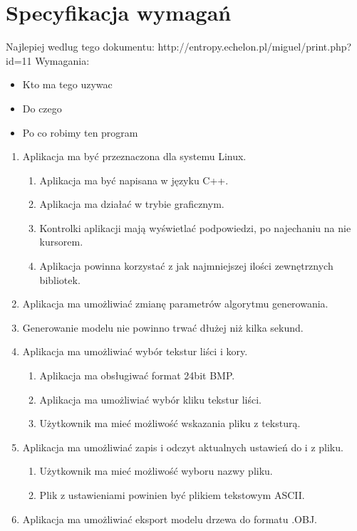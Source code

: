 \chapter{Specyfikacja wymagań}
Najlepiej wedlug tego dokumentu:
http://entropy.echelon.pl/miguel/print.php?id=11
Wymagania:\\
\begin{itemize}
\item Kto ma tego uzywac
\item Do czego
\item Po co robimy ten program
\end{itemize}
\begin{enumerate}

\item Aplikacja ma być przeznaczona dla systemu Linux. 
\begin{enumerate}
\item Aplikacja ma być napisana w języku C++.
\item Aplikacja ma działać w trybie graficznym.
\item Kontrolki aplikacji mają wyświetlać podpowiedzi, po najechaniu na nie kursorem.
\item Aplikacja powinna korzystać z jak najmniejszej ilości zewnętrznych bibliotek.
\end{enumerate}
\item Aplikacja ma umożliwiać zmianę parametrów algorytmu generowania.
\item Generowanie modelu nie powinno trwać dłużej niż kilka sekund.
\item Aplikacja ma umożliwiać wybór tekstur liści i kory.
\begin{enumerate}
\item Aplikacja ma obsługiwać format 24bit BMP. 
\item Aplikacja ma umożliwiać wybór kliku tekstur liści.
\item Użytkownik ma mieć możliwość wskazania pliku z teksturą.
\end{enumerate}
\item  Aplikacja ma umożliwiać zapis i odczyt aktualnych ustawień do i z pliku.
\begin{enumerate}
\item Użytkownik ma mieć możliwość wyboru nazwy pliku.
\item Plik z ustawieniami powinien być plikiem tekstowym ASCII.
\end{enumerate}
\item Aplikacja ma umożliwiać eksport modelu drzewa do formatu .OBJ.

\end{enumerate}
